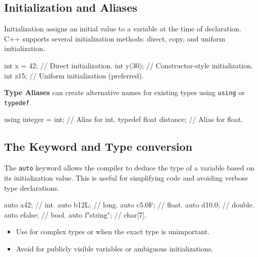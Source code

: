 \subsection{Initialization and Aliases}

\vspace{-0.5em}

Initialization assigns an initial value to a variable at the time of declaration. C++ supports several initialization methods: direct, copy, and uniform initialization.

\begin{codeblock}[language=C++, numbers=none]
int x = 42;     // Direct initialization.
int y(30);      // Constructor-style initialization.
int z{15};      // Uniform initialization (preferred).
\end{codeblock}

\textbf{Type Aliases} can create alternative names for existing types using \texttt{using} or \texttt{typedef}.

\begin{codeblock}[language=C++, numbers=none]
using integer = int;    // Alias for int.
typedef float distance; // Alias for float.
\end{codeblock}

\subsection{The  Keyword and Type conversion}

\vspace{-0.5em}

The \texttt{auto} keyword allows the compiler to deduce the type of a variable based on its initialization value. This is useful for simplifying code and avoiding verbose type declarations.

\begin{codeblock}[language=C++, numbers=none]
auto a{42};         // int.
auto b{12L};        // long.
auto c{5.0F};       // float.
auto d{10.0};       // double.
auto e{false};      // bool.
auto f{"string"};   // char[7].
\end{codeblock}

\begin{tipsblock}
    \begin{itemize}
        \item Use  for complex types or when the exact type is unimportant.
        \item Avoid  for publicly visible variables or ambiguous initializations.
    \end{itemize}
\end{tipsblock}

